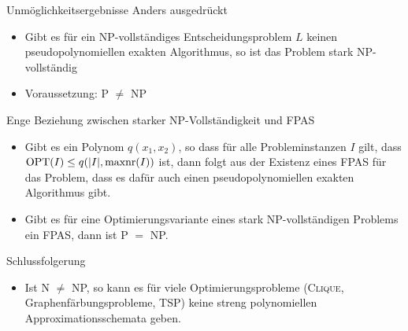 \begin{frame}{Unmöglichkeitsergebnisse}
	Anders ausgedrückt
	\begin{itemize}
		\item Gibt es für ein NP-vollständiges Entscheidungsproblem $L$ keinen pseudopolynomiellen exakten Algorithmus, so ist das Problem stark NP-vollständig
		\item Voraussetzung: P $\neq$ NP\newline
	\end{itemize}
	\pause

	Enge Beziehung zwischen starker NP-Vollständigkeit und FPAS
	\begin{itemize}
		\item Gibt es ein Polynom $q(x_1,x_2)$, so dass für alle Probleminstanzen $I$ gilt, dass $\operatorname{OPT}(I) \le q(\vert I \vert, \operatorname{maxnr}(I))$ ist, dann folgt aus der Existenz eines FPAS für das Problem, dass es dafür auch einen pseudopolynomiellen exakten Algorithmus gibt.
		\item Gibt es für eine Optimierungsvariante eines stark NP-vollständigen Problems ein FPAS, dann ist P $=$ NP.
	\end{itemize}
\end{frame}
\begin{frame}
	Schlussfolgerung
	\begin{itemize}
		\item Ist N $\neq$ NP, so kann es für viele Optimierungsprobleme (\textsc{Clique}, Graphenfärbungsprobleme, TSP) keine streng polynomiellen Approximationsschemata geben. 
	\end{itemize}
	
\end{frame}